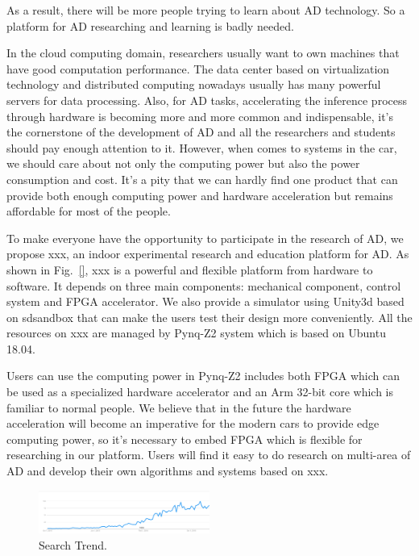 \documentclass[conference]{IEEEtran}
\begin{document}
As a result, there will be more people trying to learn about AD technology. So a platform for AD researching and learning is badly needed. 

In the cloud computing domain, researchers usually want to own machines that have good computation performance. The data center based on virtualization technology\cite{b2} and distributed computing\cite{b3} nowadays usually has many powerful servers for data processing. Also, for AD tasks, accelerating the inference process through hardware is becoming more and more common and indispensable, it's the cornerstone of the development of AD and all the researchers and students should pay enough attention to it. However, when comes to systems in the car, we should care about not only the computing power but also the power consumption and cost. It's a pity that we can hardly find one product that can provide both enough computing power and hardware acceleration but remains affordable for most of the people.

To make everyone have the opportunity to participate in the research of AD, we propose xxx, an indoor experimental research and education platform for AD. As shown in Fig.~\ref{}, xxx is a powerful and flexible platform from hardware to software. It depends on three main components: mechanical component, control system and FPGA accelerator. We also provide a simulator using Unity3d\cite{b4} based on sdsandbox\cite{b5} that can make the users test their design more conveniently. All the resources on xxx are managed by Pynq-Z2\cite{b6} system which is based on Ubuntu 18.04\cite{b7}. 

Users can use the computing power in Pynq-Z2 includes both FPGA which can be used as a specialized hardware accelerator and an Arm 32-bit core\cite{b8} which is familiar to normal people. We believe that in the future the hardware acceleration will become an imperative for the modern cars to provide edge computing power, so it's necessary to embed FPGA which is flexible for researching in our platform. Users will find it easy to do research on multi-area of AD and develop their own algorithms and systems based on xxx.

\begin{figure}[htbp]
\centerline{\includegraphics[width=0.5\textwidth]{search_result.PNG}}
\caption{Search Trend.}
\label{st}
\end{figure}
\end{document}
